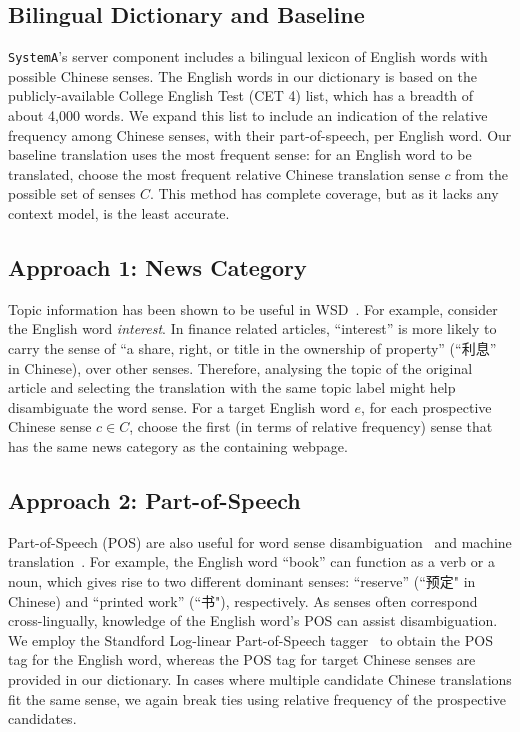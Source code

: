 \begin{CJK}{UTF8}{gbsn}
\subsection{Bilingual Dictionary and Baseline}
{\tt SystemA}'s server component includes a bilingual lexicon of
English words with possible Chinese senses. The English words in our 
dictionary is based on the publicly-available College
English Test (CET 4) list, which has a breadth of about 4,000 words.
We expand this list to include an indication of the relative frequency among Chinese senses, with their part-of-speech, per English word.
Our baseline translation uses the most frequent sense: for an English
word to be translated, choose the most frequent relative Chinese
translation sense $c$ from the possible set of senses $C$. This method
has complete coverage, but as it lacks any context model, is the least
accurate.

\subsection{Approach 1: News Category}
Topic information has been shown to be useful in
WSD~\cite{Boyd-Graber2007}.  For example, consider the English word
\textit{interest}. In finance related articles, ``interest'' is more
likely to carry the sense of ``a share, right, or title in the
ownership of property'' (``利息'' in Chinese), over other senses.
Therefore, analysing the topic of the original article and selecting
the translation with the same topic label might help disambiguate the
word sense. For a target English word $e$, for each prospective Chinese
sense $c \in C$, choose the first (in terms of relative frequency)
sense that has the same news category as the containing webpage.

\subsection{Approach 2: Part-of-Speech}
Part-of-Speech (POS) are also useful for word sense
disambiguation~\cite{Wilks1998} and machine
translation~\cite{Toutanova2002,Ueffing2003}.  For example, the
English word ``book'' can function as a verb or a noun, which gives
rise to two different dominant senses: ``reserve'' (``预定" in
Chinese) and ``printed work'' (``书"), respectively. As senses often
correspond cross-lingually, knowledge of the English word's POS can
assist disambiguation.  We employ the Standford Log-linear
Part-of-Speech tagger~\cite{Toutanova2003} to obtain the POS tag for
the English word, whereas the POS tag for target Chinese senses are
provided in our dictionary.  In cases where multiple candidate Chinese
translations fit the same sense, we again break ties using relative
frequency of the prospective candidates.


\end{CJK}
